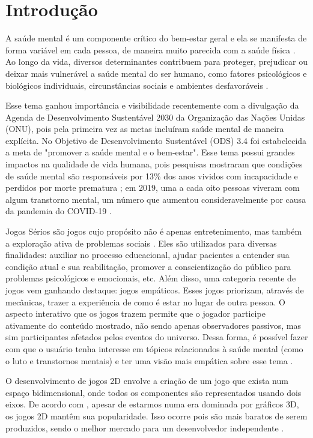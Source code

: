 \chapter{Introdução}
\label{c.introducao}


A saúde mental é um componente crítico do bem-estar geral e ela se manifesta de forma variável em cada pessoa, de maneira muito parecida com a saúde física \cite{deleene}. Ao longo da vida, diversos determinantes contribuem para proteger, prejudicar ou deixar mais vulnerável a saúde mental do ser humano, como fatores psicológicos e biológicos individuais, circunstâncias sociais  e ambientes desfavoráveis \cite{world_2022}. 

Esse tema ganhou importância e visibilidade recentemente com a divulgação da Agenda de Desenvolvimento Sustentável 2030 da Organização das Nações Unidas (ONU), pois pela primeira vez as metas incluíram saúde mental de maneira explícita. No Objetivo de Desenvolvimento Sustentável (ODS) 3.4 foi estabelecida a meta de "promover a saúde mental e o bem-estar". Esse tema possui grandes impactos na qualidade de vida humana, pois pesquisas mostraram que condições de saúde mental são responsáveis por 13\% dos anos vividos com incapacidade e perdidos por morte prematura \cite{heymann_sprague_2023}; em 2019, uma a cada oito pessoas viveram com algum transtorno mental, um número que aumentou consideravelmente por causa da pandemia do COVID-19 \cite{mentalDisorders_2022}. 

Jogos Sérios são jogos cujo propósito não é apenas entretenimento, mas também a exploração ativa de problemas sociais \cite{abt1987serious}. Eles são utilizados para diversas finalidades: auxiliar no processo educacional, ajudar pacientes a entender sua condição atual e sua reabilitação, promover a conscientização do público para problemas psicológicos e emocionais, etc. Além disso, uma categoria recente de jogos vem ganhando destaque: jogos empáticos. Esses jogos priorizam, através de mecânicas, trazer a experiência de como é estar no lugar de outra pessoa. O aspecto interativo que os jogos trazem permite que o jogador participe ativamente do conteúdo mostrado, não sendo apenas observadores passivos, mas sim participantes afetados pelos eventos do universo. Dessa forma, é possível fazer com que o usuário tenha interesse em tópicos relacionados à saúde mental (como o luto e transtornos mentais) e ter uma visão mais empática sobre esse tema \cite{10.1145/3638067.3638104}.

O desenvolvimento de jogos 2D envolve a criação de um jogo que exista num espaço bidimensional, onde todos os componentes são representados usando dois eixos. De acordo com , apesar de estarmos numa era dominada por gráficos 3D, os jogos 2D mantêm sua popularidade. Isso ocorre pois são mais baratos de serem produzidos, sendo o melhor mercado para um desenvolvedor independente \cite{book}.

